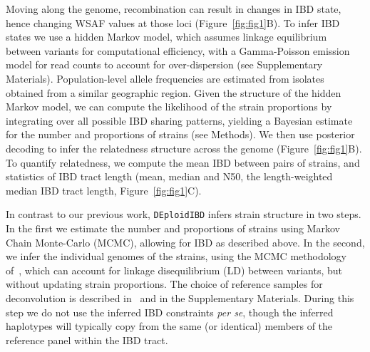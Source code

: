 \documentclass[9pt,lineno]{elife}
\begin{document}
Moving along the genome, recombination can result in changes in IBD state, hence changing WSAF values at those loci (Figure~\ref{fig:fig1}B).  To infer IBD states we use a hidden Markov model, which assumes linkage equilibrium between variants for computational efficiency, with a Gamma-Poisson emission model for read counts to account for over-dispersion (see Supplementary Materials).  Population-level allele frequencies are estimated from isolates obtained from a similar geographic region.  Given the structure of the hidden Markov model, we can compute the likelihood of the strain proportions by integrating over all possible IBD sharing patterns, yielding a Bayesian estimate for the number and proportions of strains (see Methods).  We then use posterior decoding to infer the relatedness structure across the genome (Figure~\ref{fig:fig1}B). To quantify relatedness, we compute the mean IBD between pairs of strains, and statistics of IBD tract length (mean, median and N50, the length-weighted median IBD tract length, Figure~\ref{fig:fig1}C).

In contrast to our previous work, \texttt{DEploidIBD} infers strain structure in two steps.  In the first we estimate the number and proportions of strains using Markov Chain Monte-Carlo (MCMC), allowing for IBD as described above.  In the second, we infer the individual genomes of the strains, using the MCMC methodology of~\citet{Zhu2017}, which can account for linkage disequilibrium (LD) between variants, but without updating strain proportions.  The choice of reference samples for deconvolution is described in~\citet{Zhu2017} and in the Supplementary Materials.  During this step we do not use the inferred IBD constraints {\em per se}, though the inferred haplotypes will typically copy from the same (or identical) members of the reference panel within the IBD tract.
\end{document}
